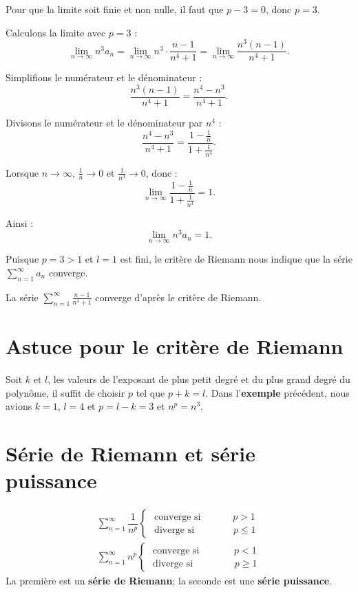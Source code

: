 \documentclass{report}
\begin{document}
\begin{multicols*}{3}
Pour que la limite soit finie et non nulle, il faut que $p - 3 = 0$, donc $p = 3$.


Calculons la limite avec $p = 3$ :
\[
\lim_{n \to \infty} n^3 a_n = \lim_{n \to \infty}
n^3 \cdot \frac{n - 1}{n^4 + 1} = \lim_{n \to \infty}
\frac{n^3 (n - 1)}{n^4 + 1}.
\]

Simplifions le numérateur et le dénominateur :
\[
\frac{n^3 (n - 1)}{n^4 + 1} = \frac{n^4 - n^3}{n^4 + 1}.
\]

Divisons le numérateur et le dénominateur par $n^4$ :
\[
\frac{n^4 - n^3}{n^4 + 1} = \frac{1 - \frac{1}{n}}{1 + \frac{1}{n^4}}.
\]

Lorsque $n \to \infty$, $\frac{1}{n} \to 0$ et $\frac{1}{n^4} \to 0$, donc :
\[
\lim_{n \to \infty} \frac{1 - \frac{1}{n}}{1 + \frac{1}{n^4}} = 1.
\]

Ainsi :
\[
\lim_{n \to \infty} n^3 a_n = 1.
\]


Puisque $p = 3 > 1$ et $l = 1$ est fini, le critère de Riemann nous indique que
la série $\sum_{n=1}^\infty a_n$ converge.


La série $\displaystyle \sum_{n=1}^\infty \frac{n - 1}{n^4 + 1}$ converge
d’après le critère de Riemann.



    \section{Astuce pour le critère de Riemann}
    Soit $k$ et $l$, les valeurs de l'exposant de plus petit degré et du plus grand 
    degré du polynôme, il suffit de choisir $p$ tel que $p + k = l$.  
    Dans l'\textcolor{myb}{\textbf{exemple}} précédent, nous avions                 
    $k = 1$, $l = 4$ et $p = l - k  = 3$ et $n^p = n^3$.  

    \section{Série de Riemann et série puissance} 
    \vspace{-1em}
    \begin{align*}
        \sum_{n=1}^{\infty }\dfrac{1}{n^p} 
        \begin{cases} 
        \text{ converge si } \quad\quad\quad p > 1 \\
        \text{ diverge si } \quad\quad\quad\;\;\, p \leq 1
        \end{cases}
        \\
        \sum_{n=1}^{\infty} n^p 
        \begin{cases} 
        \text{ converge si } \quad\quad\quad\; p < 1 \\
        \text{ diverge si } \quad\quad\quad\;\;\;\, p \geq 1
        \end{cases}
    \end{align*}
    La première est un \textbf{série de Riemann}; la seconde 
    est une \textbf{série puissance}. 


\end{multicols*}
\end{document}
